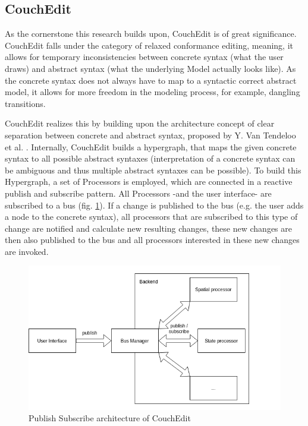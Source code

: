 \documentclass[10pt,a4paper,oneside]{scrartcl}
\begin{document}
		
		

\subsection{CouchEdit}
\label{CouchEdit}

As the cornerstone this research builds upon, CouchEdit is of great significance. CouchEdit falls under the category of relaxed conformance editing, meaning, it allows for temporary inconsistencies between concrete syntax (what the user draws) and abstract syntax (what the underlying Model actually looks like). As the concrete syntax does not always have to map to a syntactic correct abstract model, it allows for more freedom in the modeling process, for example, dangling transitions. 

CouchEdit realizes this by building upon the architecture concept of clear separation between concrete and abstract syntax, proposed by Y. Van Tendeloo et al. \cite{van_tendeloo_concrete_2017}. Internally, CouchEdit builds a hypergraph, that maps the given concrete syntax to all possible abstract syntaxes (interpretation of a concrete syntax can be ambiguous and thus multiple abstract syntaxes can be possible). To build this Hypergraph, a set of Processors is employed, which are connected in a reactive publish and subscribe pattern. All Processors -and the user interface- are subscribed to a bus (fig. \ref{fig:processors}). If a change is published to the bus (e.g. the user adds a node to the concrete syntax), all processors that are subscribed to this type of change are notified and calculate new resulting changes, these new changes are then also published to the bus and all processors interested in these new changes are invoked. 

\begin{figure}
	\label{fig:processors}
  \centering
  \includegraphics[width=.6\linewidth]{./couchedit-processors}
	\caption{Publish Subscribe architecture of CouchEdit}
\end{figure}
\end{document}
